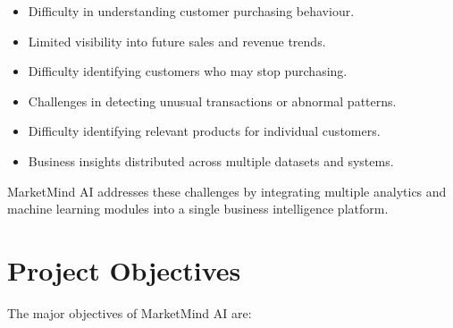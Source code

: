 \documentclass[12pt,a4paper]{report}
\begin{document}
\begin{itemize}[leftmargin=1.2cm]

\item Difficulty in understanding customer purchasing behaviour.

\item Limited visibility into future sales and revenue trends.

\item Difficulty identifying customers who may stop purchasing.

\item Challenges in detecting unusual transactions or abnormal patterns.

\item Difficulty identifying relevant products for individual customers.

\item Business insights distributed across multiple datasets and systems.

\end{itemize}

MarketMind AI addresses these challenges by integrating multiple
analytics and machine learning modules into a single business intelligence
platform.



\section{Project Objectives}

The major objectives of MarketMind AI are:
\end{document}
